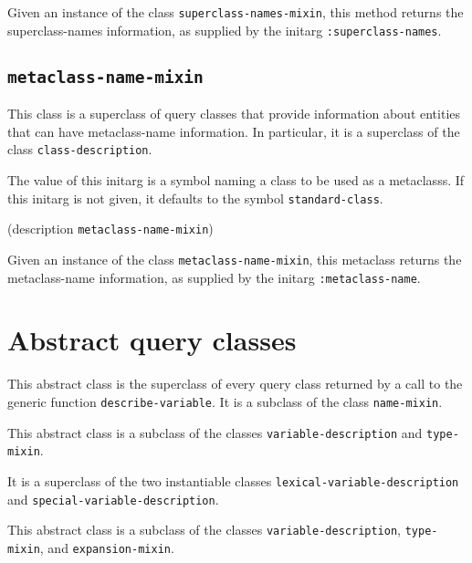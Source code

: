 Given an instance of the class \texttt{superclass-names-mixin}, this
method returns the superclass-names information, as supplied by the
initarg \texttt{:superclass-names}.

\subsection{\texttt{metaclass-name-mixin}}
\label{sec-metaclass-name-mixin}

{\footnotesize
{}
}

This class is a superclass of query classes that provide information
about entities that can have metaclass-name information.  In
particular, it is a superclass of the class
\texttt{class-description}.

{\footnotesize
{}
}

The value of this initarg is a symbol naming a class to be used as a
metaclasss.  If this initarg is not given, it defaults to the symbol
\texttt{standard-class}.

{\footnotesize
{} {(description {\tt metaclass-name-mixin})}
}

Given an instance of the class \texttt{metaclass-name-mixin}, this
metaclass returns the metaclass-name information, as supplied by the
initarg \texttt{:metaclass-name}.

\section{Abstract query classes}

{\footnotesize
{}
}

This abstract class is the superclass of every query class returned by
a call to the generic function \texttt{describe-variable}.  It is a
subclass of the class \texttt{name-mixin}.

{\footnotesize
{}
}

This abstract class is a subclass of the classes
\texttt{variable-description} and \texttt{type-mixin}.

It is a superclass of the two instantiable classes
\texttt{lexical-variable-description} and
\texttt{special-variable-description}.

{\footnotesize
{}
}

This abstract class is a subclass of the classes
\texttt{variable-description}, \texttt{type-mixin}, and
\texttt{expansion-mixin}.

